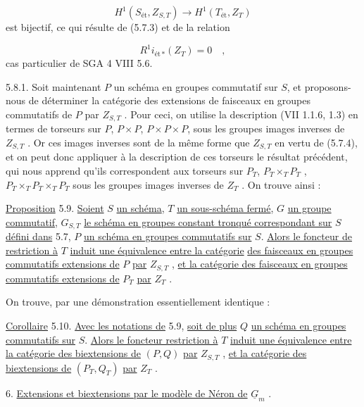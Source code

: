 \begin{equation*}
H^1(S_{\text{ét}}, Z_{S,T}) \longrightarrow H^1(T_{\text{ét}}, Z_T)
\end{equation*}
est bijectif, ce qui résulte de (5.7.3) et de la relation

\begin{equation*}
R^1 i_{\text{ét}\,*}(Z_T) = 0 \quad ,
\end{equation*}
cas particulier de SGA 4 VIII 5.6.

5.8.1. Soit maintenant $P$ un schéma en groupes commutatif sur $S$, et proposons-nous de déterminer la catégorie des extensions de faisceaux en groupes commutatifs de $P$ par $Z_{S,T}$ . Pour ceci, on utilise la description (VII 1.1.6, 1.3) en termes de torseurs sur $P$, $P \times P$, $P \times P \times P$, sous les groupes images inverses de $Z_{S,T}$ . Or ces images inverses sont de la même forme que $Z_{S,T}$ en vertu de (5.7.4), et on peut donc appliquer à la description de ces torseurs le résultat précédent, qui nous apprend qu'ils correspondent aux torseurs sur $P_T$, $P_T \times_T P_T$ , $P_T \times_T P_T \times_T P_T$ sous les groupes images inverses de $Z_T$ . On trouve ainsi :

\underline{Proposition} 5.9. \underline{Soient} $S$ \underline{un schéma}, $T$ \underline{un sous-schéma fermé}, $G$ \underline{un groupe commutatif}, $G_{S,T}$ \underline{le schéma en groupes constant tronqué correspondant sur} $S$ \underline{défini dans} 5.7, $P$ \underline{un schéma en groupes commutatifs sur} $S$. \underline{Alors le foncteur de restriction à} $T$ \underline{induit une équivalence entre la catégorie}
\underline{des faisceaux en groupes commutatifs extensions de} $P$ \underline{par} $Z_{S,T}$ , \underline{et la catégorie des faisceaux en groupes commutatifs extensions de} $P_T$ \underline{par} $Z_T$ .

On trouve, par une démonstration essentiellement identique :

\underline{Corollaire} 5.10. \underline{Avec les notations de} 5.9, \underline{soit de plus} $Q$ \underline{un schéma en groupes commutatifs sur} $S$. \underline{Alors le foncteur restriction à} $T$ \underline{induit une équivalence entre la catégorie des biextensions de} $(P,Q)$ \underline{par} $Z_{S,T}$ , \underline{et la catégorie des biextensions de} $(P_T,Q_T)$ \underline{par} $Z_T$ .

6. \underline{Extensions et biextensions par le modèle de Néron de} $\underline{G}_m$ .

